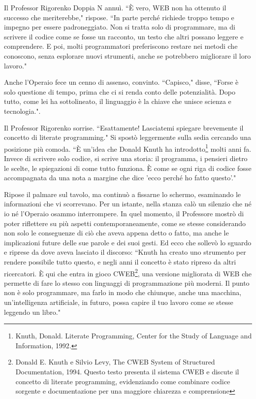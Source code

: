 \documentclass[12pt,b5paper]{article}
\begin{document}
Il Professor Rigorenko Doppia N annuì. ``È vero, WEB non ha ottenuto il successo
che meriterebbe," rispose. ``In parte perché richiede troppo tempo e impegno
per essere padroneggiato. Non si tratta solo di programmare, ma di scrivere
il codice come se fosse un racconto, un testo che altri possano leggere e
comprendere. E poi, molti programmatori preferiscono restare nei metodi che
conoscono, senza esplorare nuovi strumenti, anche se potrebbero migliorare il
loro lavoro."

Anche l'Operaio fece un cenno di assenso, convinto. ``Capisco," disse, ``Forse è
solo questione di tempo, prima che ci si renda conto delle potenzialità. Dopo
tutto, come lei ha sottolineato, il linguaggio è la chiave che unisce scienza e
tecnologia.".

Il Professor Rigorenko sorrise. ``Esattamente! Lasciatemi spiegare brevemente
il concetto di literate programming." Si spostò leggermente sulla sedia cercando
una posizione più comoda. ``È un'idea che Donald Knuth ha introdotto\footnote{Knuth,
Donald. Literate Programming, Center for the Study of Language and Information,
1992.} molti anni fa. Invece di scrivere solo codice, si scrive una storia: il
programma, i pensieri dietro le scelte, le spiegazioni di come tutto funziona.
È come se ogni riga di codice fosse accompagnata da una nota a margine che dice
'ecco perché ho fatto questo'."

Ripose il palmare sul tavolo, ma continuò a fissarne lo schermo, esaminando
le informazioni che vi scorrevano. Per un istante, nella stanza calò un silenzio
che né io né l'Operaio osammo interrompere. In quel momento, il Professore mostrò di poter 
riflettere su più aspetti contemporaneamente, come se stesse considerando non
solo le conseguenze di ciò che aveva appena detto o fatto, ma anche le implicazioni 
future delle sue parole e dei suoi gesti. Ed ecco che sollevò lo sguardo e riprese da dove aveva
lasciato il discorso: ``Knuth ha creato uno strumento per rendere possibile tutto questo, e negli anni il concetto è stato ripreso da
altri ricercatori. È qui che entra in gioco CWEB\footnote{Donald E. Knuth e Silvio
Levy, The CWEB System of Structured Documentation, 1994. Questo testo presenta
il sistema CWEB e discute il concetto di literate programming, evidenziando come
combinare codice sorgente e documentazione per una maggiore chiarezza e
comprensione}, una versione migliorata di WEB che permette di fare lo stesso con linguaggi
di programmazione più moderni. Il punto non è solo programmare, ma farlo in modo
che chiunque, anche una macchina, un'intelligenza artificiale, in futuro, possa
capire il tuo lavoro come se stesse leggendo un libro." 
\end{document}

